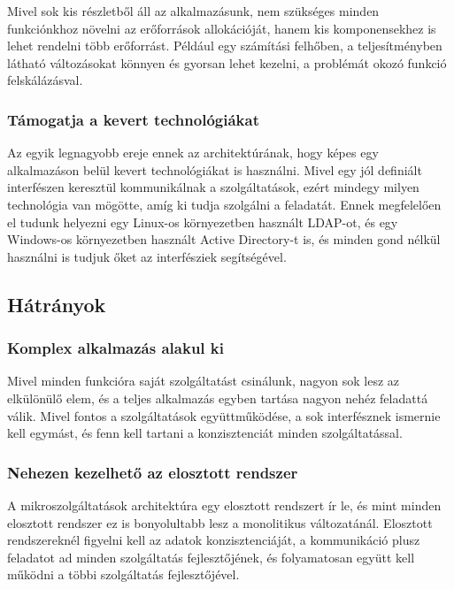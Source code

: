 \documentclass[11pt,magyar,a4paper,twoside,]{report}
\begin{document}
Mivel sok kis részletből áll az alkalmazásunk, nem szükséges minden
funkciónkhoz növelni az erőforrások allokációját, hanem kis
komponensekhez is lehet rendelni több erőforrást. Például egy számítási
felhőben, a teljesítményben látható változásokat könnyen és gyorsan
lehet kezelni, a problémát okozó funkció felskálázásval.

\subsubsection{Támogatja a kevert
technológiákat}\label{tuxe1mogatja-a-kevert-technoluxf3giuxe1kat}

Az egyik legnagyobb ereje ennek az architektúrának, hogy képes egy
alkalmazáson belül kevert technológiákat is használni. Mivel egy jól
definiált interfészen keresztül kommunikálnak a szolgáltatások, ezért
mindegy milyen technológia van mögötte, amíg ki tudja szolgálni a
feladatát. Ennek megfelelően el tudunk helyezni egy Linux-os
környezetben használt LDAP-ot, és egy Windows-os környezetben használt
Active Directory-t is, és minden gond nélkül használni is tudjuk őket az
interfésziek segítségével.

\subsection{Hátrányok}\label{huxe1truxe1nyok}

\subsubsection{Komplex alkalmazás alakul
ki}\label{komplex-alkalmazuxe1s-alakul-ki}

Mivel minden funkcióra saját szolgáltatást csinálunk, nagyon sok lesz az
elkülönülő elem, és a teljes alkalmazás egyben tartása nagyon nehéz
feladattá válik. Mivel fontos a szolgáltatások együttműködése, a sok
interfésznek ismernie kell egymást, és fenn kell tartani a
konzisztenciát minden szolgáltatással.

\subsubsection{Nehezen kezelhető az elosztott
rendszer}\label{nehezen-kezelhetux151-az-elosztott-rendszer}

A mikroszolgáltatások architektúra egy elosztott rendszert ír le, és
mint minden elosztott rendszer ez is bonyolultabb lesz a monolitikus
változatánál. Elosztott rendszereknél figyelni kell az adatok
konzisztenciáját, a kommunikáció plusz feladatot ad minden szolgáltatás
fejlesztőjének, és folyamatosan együtt kell működni a többi szolgáltatás
fejlesztőjével.
\end{document}
